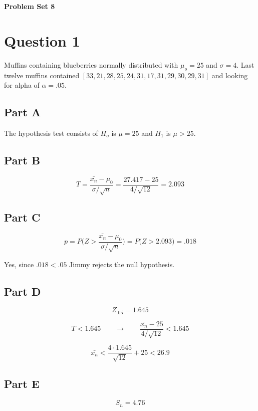 \documentclass[letterpaper]{article}
\begin{document}
\vspace*{6pt}

\noindent \textbf{\huge{Problem Set 8}}

\bigskip

\section*{Question 1}

Muffins containing blueberries normally distributed with $\mu_o = 25$ and $\sigma = 4$. Last twelve muffins contained $[33, 21, 28, 25, 24, 31, 17, 31, 29, 30, 29, 31]$ and looking for alpha of $\alpha = .05$.

\subsection*{Part A}

The hypothesis test consists of $H_o$ is $\mu = 25$ and $H_1$ is $\mu > 25$.

\subsection*{Part B}

$$T = \frac{\bar{x_n} - \mu_0}{\sigma / \sqrt{n}} = \frac{27.417 - 25}{4 / \sqrt{12}} = 2.093$$

\subsection*{Part C}

$$p = P \Big( Z > \frac{\bar{x_n} - \mu_0}{\sigma / \sqrt{n}} \Big) = P \Big( Z > 2.093 \Big) = .018$$

Yes, since $.018 < .05$ Jimmy rejects the null hypothesis.

\subsection*{Part D}

$$Z_.05 = 1.645$$

$$T < 1.645 \qquad \longrightarrow \qquad \frac{\bar{x_n} - 25}{4 / \sqrt{12}} < 1.645$$

$$\bar{x_n} < \frac{4 \cdot 1.645}{\sqrt{12}} + 25 < 26.9$$

\subsection*{Part E}

$$S_n = 4.76$$
\end{document}
